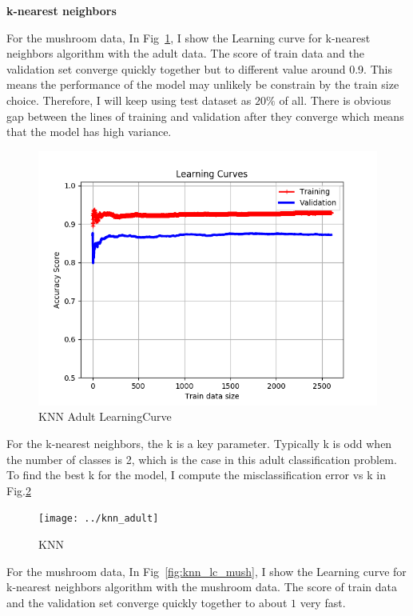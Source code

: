 \documentclass[         %
aps,                    %
prl,                    %
showpacs,               %
superscriptaddress,    %
nofootinbib,            %
twocolumn,             %
showkeys,               %
preprintnumbers,        %
floatfix               %
]{revtex4-1}               %
\begin{document}
{\bf k-nearest neighbors}\label{knn}

For the mushroom data, In Fig~\ref{fig:knn_lc_adult}, I show the Learning curve for k-nearest neighbors algorithm with the adult data. 
The score of train data and the validation set converge quickly together but to different value around 0.9. 
This means the performance of the model may unlikely be constrain by the train size choice. Therefore, I will keep using test dataset as $20\%$ of all. 
There is obvious gap between the lines of training and validation after they converge which means that the model has high variance.
\begin{figure}[h!]
  \centering \includegraphics[width=\linewidth]{../knn_adult_LearningCurve}
  \caption{KNN Adult LearningCurve\label{fig:knn_lc_adult}}
\end{figure}
For the k-nearest neighbors, the k is a key parameter.
Typically k is odd when the number of classes is 2, which is the case in this adult classification problem. 
To find the best k for the model, I compute the misclassification error vs k in Fig.\ref{fig:knn_adult}
\begin{figure}[h!]
  \centering \texttt{[image: ../knn\_adult]}
  \caption{KNN\label{fig:knn_adult}}
\end{figure}
For the mushroom data, In Fig~\ref{fig:knn_lc_mush}, I show the Learning curve for k-nearest neighbors algorithm with the mushroom data. 
The score of train data and the validation set converge quickly together to about $1$ very fast. 
\end{document}
